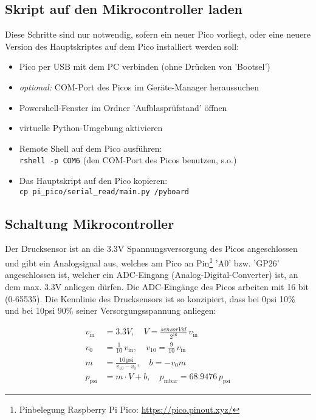 \documentclass[german, 11pt]{scrartcl}
\begin{document}
\subsection{Skript auf den Mikrocontroller laden}
Diese Schritte sind nur notwendig, sofern ein neuer Pico vorliegt, oder eine neuere Version des Hauptskriptes auf dem Pico installiert werden soll:
\begin{itemize}
    \item Pico per USB mit dem PC verbinden (ohne Drücken von 'Bootsel')
     \item \textit{optional:} COM-Port des Picos im Geräte-Manager heraussuchen
    \item Powershell-Fenster im Ordner 'Aufblasprüfstand' öffnen
    \item virtuelle Python-Umgebung aktivieren
    \item Remote Shell auf dem Pico ausführen:\\
    \texttt{rshell -p COM6} \hfill (den COM-Port des Picos benutzen, s.o.)
    \item Das Hauptskript auf den Pico kopieren:\\
    \texttt{cp pi\_pico/serial\_read/main.py /pyboard}
\end{itemize}

\subsection{Schaltung Mikrocontroller}
Der Drucksensor ist an die 3.3V Spannungsversorgung des Picos angeschlossen und gibt ein Analogsignal aus,
welches am Pico an Pin\footnote[2]{Pinbelegung Raspberry Pi Pico: \url{https://pico.pinout.xyz/}} 'A0' bzw. 'GP26' angeschlossen ist,
welcher ein ADC-Eingang (Analog-Digital-Converter) ist, an dem max. 3.3V anliegen dürfen. Die ADC-Eingänge des Picos arbeiten mit 16 bit (0-65535).
Die Kennlinie des Drucksensors ist so konzipiert, dass bei 0psi 10\% und bei 10psi 90\% seiner Versorgungsspannung anliegen:

\begin{equation*}
    \begin{aligned}
        v_{\text{in}} &= 3.3V, \quad V = \frac{sensorVal}{2^{16}}\,v_{\text{in}} \\
        v_0 &= \frac{1}{10}\,v_{\text{in}}, \quad v_{10} = \frac{9}{10}\,v_{\text{in}} \\
        m &= \frac{10\,\text{psi}}{v_{10}-v_0}, \quad b = -v_0 m \\
        p_{\text{psi}} &= m \cdot V + b, \quad p_{\text{mbar}} = 68.9476\,p_{\text{psi}}
    \end{aligned}
\end{equation*}
\end{document}
